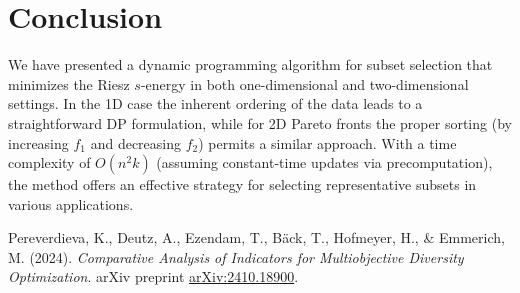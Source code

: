 \documentclass[11pt]{article}
\begin{document}
\section{Conclusion}

We have presented a dynamic programming algorithm for subset selection that minimizes the Riesz \(s\)-energy in both one-dimensional and two-dimensional settings. In the 1D case the inherent ordering of the data leads to a straightforward DP formulation, while for 2D Pareto fronts the proper sorting (by increasing \(f_1\) and decreasing \(f_2\)) permits a similar approach. With a time complexity of \(O(n^2 k)\) (assuming constant-time updates via precomputation), the method offers an effective strategy for selecting representative subsets in various applications.


\begin{thebibliography}{1}
 Pereverdieva, K., Deutz, A., Ezendam, T., Bäck, T., Hofmeyer, H., \& Emmerich, M. (2024). \emph{Comparative Analysis of Indicators for Multiobjective Diversity Optimization}. arXiv preprint \href{https://arxiv.org/abs/2410.18900}{arXiv:2410.18900}.
\end{thebibliography}
\end{document}
